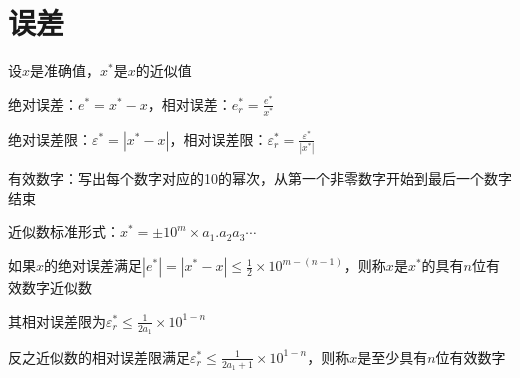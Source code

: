 \section{误差}

设$x$是准确值，$x^*$是$x$的近似值

绝对误差：$e^* =x^* - x$，相对误差：$e_r^* = \frac{e^*}{x^*}$

绝对误差限：$\varepsilon^* = |x^* - x|$，相对误差限：$\varepsilon_r^* = \frac{\varepsilon^*}{|x^*|}$

有效数字：写出每个数字对应的10的幂次，从第一个非零数字开始到最后一个数字结束

近似数标准形式：$x^* = \pm 10^m \times a_1.a_2a_3 \cdots$

如果$x$的绝对误差满足$|e^*| = |x^* - x| \leq \frac{1}{2}\times 10^{m-(n-1)}$，则称$x$是$x^*$的具有$n$位有效数字近似数

其相对误差限为$\varepsilon_r^* \leq \frac{1}{2a_1}\times 10^{1-n}$

反之近似数的相对误差限满足$\varepsilon_r^* \leq \frac{1}{2a_1+1}\times 10^{1-n}$，则称$x$是至少具有$n$位有效数字